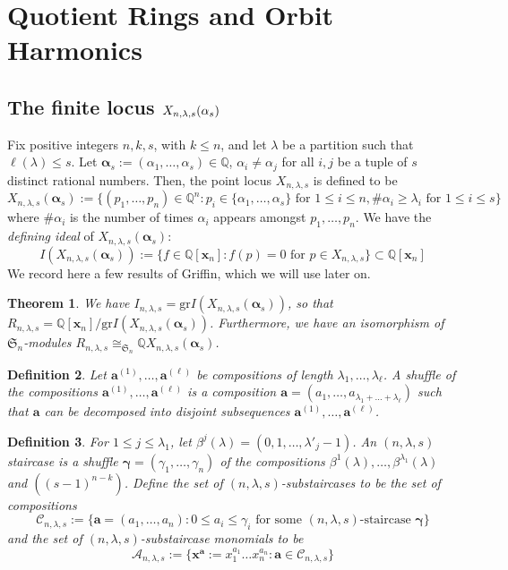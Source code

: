 \documentclass[11pt]{amsart}
\numberwithin{equation}{section}
\newtheorem{theorem}{Theorem}[section]
\newtheorem{definition}[theorem]{Definition}
\theoremstyle{definition}
\newcommand{\symm}{{\mathfrak{S}}}
\newcommand{\gr}{{\mathrm {gr}}}
\newcommand{\AAA}{{\mathcal{A}}}
\newcommand{\CCC}{{\mathcal{C}}}
\newcommand{\QQ}{{\mathbb{Q}}}
\newcommand{\xxx}{{\mathbf{x}}}
\newcommand{\aalpha}{{{\bm \alpha}}}
\begin{document}
\section{Quotient Rings and Orbit Harmonics}\label{sec:orbitharmonics}

\subsection{The finite locus $X_{n,\lambda,s}(\boldmath{\alpha}_s)$}

Fix positive integers $n,k,s$, with $k \leq n$, and let $\lambda$ be a partition such that $\ell(\lambda) \leq s$. Let $\aalpha_s := (\alpha_1,\dots,\alpha_s) \in \QQ$, $\alpha_i \neq \alpha_j$ for all $i,j$ be a tuple of $s$ distinct rational numbers. Then, the point locus $X_{n,\lambda,s}$ is defined to be
\[
X_{n,\lambda,s}(\aalpha_s) := \{ (p_1,\dots,p_n) \in \QQ^n : p_i \in \{\alpha_1,\dots,\alpha_s\} \text{ for } 1 \leq i \leq n, \#\alpha_i \geq \lambda_i \text{ for } 1 \leq i \leq s \}
\]
where $\#\alpha_i$ is the number of times $\alpha_i$ appears amongst $p_1,\dots,p_n$. We have the \emph{defining ideal} of $X_{n,\lambda,s}(\aalpha_s)$:
\[
I(X_{n,\lambda,s}(\aalpha_s)) := \{ f \in \QQ[\xxx_n] : f(p) = 0 \text{ for } p \in X_{n,\lambda,s}\} \subset \QQ[\xxx_n]
\]
We record here a few results of Griffin, which we will use later on.
\begin{theorem}\cite{G}
    We have $I_{n,\lambda,s} = \gr I(X_{n,\lambda,s}(\aalpha_s))$, so that $R_{n,\lambda,s} = \QQ[\xxx_n]/\gr I(X_{n,\lambda,s}(\aalpha_s))$. Furthermore, we have an isomorphism of $\symm_n$-modules $R_{n,\lambda,s} \cong_{\symm_n} \QQ X_{n,\lambda,s}(\aalpha_s)$.
\end{theorem}

\begin{definition}
    Let $\mathbf{a}^{(1)},\dots,\mathbf{a}^{(\ell)}$ be compositions of length $\lambda_1,\dots,\lambda_\ell$. A \emph{shuffle} of the compositions $\mathbf{a}^{(1)},\dots,\mathbf{a}^{(\ell)}$ is a composition $\mathbf{a} = (a_1,\dots,a_{\lambda_1 + \dots + \lambda_\ell})$ such that $\mathbf{a}$ can be decomposed into disjoint subsequences $\mathbf{a}^{(1)},\dots,\mathbf{a}^{(\ell)}$.
\end{definition}

\begin{definition}\cite{G}\label{def: nls-substaircases}
    For $1 \leq j \leq \lambda_1$, let $\beta^j(\lambda) = (0,1,\dots,\lambda'_j -1)$. An \emph{$(n,\lambda,s)$ staircase} is a shuffle $\mathbf{\gamma} = (\gamma_1,\dots,\gamma_n)$ of the compositions $\beta^1(\lambda),\dots,\beta^{\lambda_1}(\lambda)$ and $((s-1)^{n-k})$. Define the set of \emph{$(n,\lambda,s)$-substaircases} to be the set of compositions
    \[
\CCC_{n,\lambda,s} := \{ \mathbf{a} = (a_1,\dots,a_n) : 0 \leq a_i \leq \gamma_i \text{ for some } (n,\lambda,s)\text{-staircase } \mathbf{\gamma} \}
\]
    and the set of $(n,\lambda,s)$-substaircase monomials to be
    \[
\AAA_{n,\lambda,s} := \{ \xxx^\mathbf{a} := x_1^{a_1}\dots x_n^{a_n} : \mathbf{a} \in \CCC_{n,\lambda,s} \}
\]
\end{definition}
\end{document}
